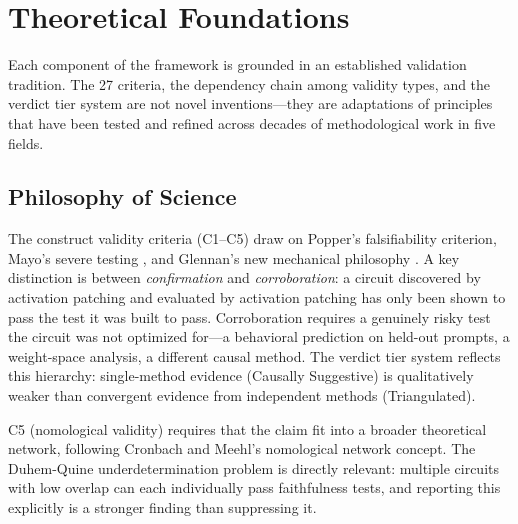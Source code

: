 \documentclass[10pt]{article}
\begin{document}
\section{Theoretical Foundations}
\label{sec:foundations}

Each component of the framework is grounded in an established validation tradition. The 27 criteria, the dependency chain among validity types, and the verdict tier system are not novel inventions---they are adaptations of principles that have been tested and refined across decades of methodological work in five fields.

\subsection{Philosophy of Science}
\label{sec:phil-sci}

The construct validity criteria (C1--C5) draw on Popper's falsifiability criterion, Mayo's severe testing \citep{mayo2018statistical}, and Glennan's new mechanical philosophy \citep{glennan2017new}. A key distinction is between \emph{confirmation} and \emph{corroboration}: a circuit discovered by activation patching and evaluated by activation patching has only been shown to pass the test it was built to pass. Corroboration requires a genuinely risky test the circuit was not optimized for---a behavioral prediction on held-out prompts, a weight-space analysis, a different causal method. The verdict tier system reflects this hierarchy: single-method evidence (Causally Suggestive) is qualitatively weaker than convergent evidence from independent methods (Triangulated).

C5 (nomological validity) requires that the claim fit into a broader theoretical network, following Cronbach and Meehl's nomological network concept. The Duhem-Quine underdetermination problem is directly relevant: multiple circuits with low overlap can each individually pass faithfulness tests, and reporting this explicitly is a stronger finding than suppressing it.
\end{document}

